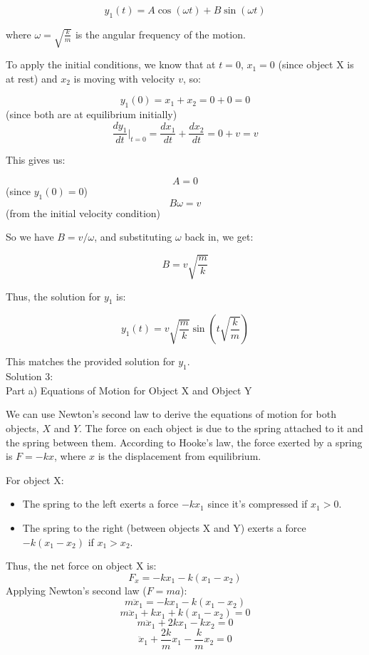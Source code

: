 \documentclass[a4paper,11pt]{article}
\begin{document}
\[ y_1(t) = A \cos(\omega t) + B \sin(\omega t) \]

where \( \omega = \sqrt{\frac{k}{m}} \) is the angular frequency of the motion.

To apply the initial conditions, we know that at \( t = 0 \), \( x_1 = 0 \) (since object X is at rest) and \( x_2 \) is moving with velocity \( v \), so:

\[ y_1(0) = x_1 + x_2 = 0 + 0 = 0 \] (since both are at equilibrium initially)
\[ \frac{dy_1}{dt}\Big|_{t=0} = \frac{dx_1}{dt} + \frac{dx_2}{dt} = 0 + v = v \]

This gives us:

\[ A = 0 \] (since \( y_1(0) = 0 \))
\[ B\omega = v \] (from the initial velocity condition)

So we have \( B = v / \omega \), and substituting \( \omega \) back in, we get:

\[ B = v \sqrt{\frac{m}{k}} \]

Thus, the solution for \( y_1 \) is:

\[ y_1(t) = v \sqrt{\frac{m}{k}} \sin(t \sqrt{\frac{k}{m}}) \]

This matches the provided solution for \( y_1 \). \\

\noindent Solution 3: \\

Part a) Equations of Motion for Object X and Object Y

We can use Newton's second law to derive the equations of motion for both objects, \(X\) and \(Y\). The force on each object is due to the spring attached to it and the spring between them. According to Hooke's law, the force exerted by a spring is \( F = -kx \), where \( x \) is the displacement from equilibrium.

For object X:

\begin{itemize}
  \item The spring to the left exerts a force \( -kx_1 \) since it's compressed if \( x_1 > 0 \).
  \item The spring to the right (between objects X and Y) exerts a force \( -k(x_1 - x_2) \) if \( x_1 > x_2 \).
\end{itemize}

Thus, the net force on object X is:
\[ F_x = -kx_1 - k(x_1 - x_2) \]
Applying Newton's second law (\( F = ma \)):
\[ m\ddot{x}_1 = -kx_1 - k(x_1 - x_2) \]
\[ m\ddot{x}_1 + kx_1 + k(x_1 - x_2) = 0 \]
\[ m\ddot{x}_1 + 2kx_1 - kx_2 = 0 \]
\[ \ddot{x}_1 + \frac{2k}{m}x_1 - \frac{k}{m}x_2 = 0 \]
\end{document}

